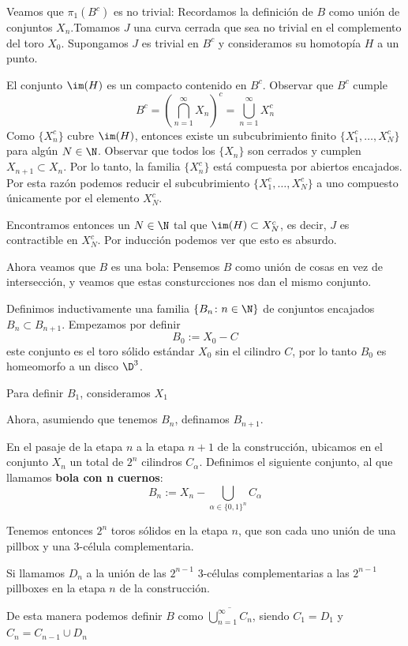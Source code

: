 
Veamos que $\pi_1(B^c)$ es no trivial: Recordamos la definición de $B$ como unión de conjuntos $X_n$.Tomamos $J$ una curva cerrada que sea no trivial en el complemento del toro $X_0$. Supongamos $J$ es trivial en $B^c$ y consideramos su homotopía $H$ a un punto. 
            
El conjunto $\im(H)$ es un compacto contenido en $B^c$. Observar que $B^c$ cumple $$B^c=\left(\bigcap\limits_{n=1}^\infty X_n\right)^c=\bigcup\limits_{n=1}^\infty X_n^c$$ 
Como $\{X_n^c\}$ cubre $\im(H)$, entonces existe un subcubrimiento finito $\{X_1^c,\dots, X_N^c\}$ para algún $N\in\N$. Observar que todos los $\{X_n\}$ son cerrados y cumplen $X_{n+1}\subset X_n$. Por lo tanto, la familia $\{X_n^c\}$ está compuesta por abiertos encajados. Por esta razón podemos reducir el subcubrimiento $\{X_1^c,\dots, X_N^c\}$ a uno compuesto únicamente por el elemento $X_N^c$. 

Encontramos entonces un $N\in\N$ tal que $\im(H)\subset X_N^c$, es decir, $J$ es contractible en $X_N^c$. Por inducción podemos ver que esto es absurdo. 

Ahora veamos que $B$ es una bola: Pensemos $B$ como unión de cosas en vez de intersección, y veamos que estas consturcciones nos dan el mismo conjunto. 

Definimos inductivamente una familia $\{B_n\colon n\in\N\}$ de conjuntos encajados $B_{n}\subset B_{n+1}$. Empezamos por definir $$B_0:= X_0 - C$$ este conjunto es el toro sólido estándar $X_0$ sin el cilindro $C$, por lo tanto $B_0$ es homeomorfo a un disco $\D^3$.

Para definir $B_1$, consideramos $X_1$

Ahora, asumiendo que tenemos $B_n$, definamos $B_{n+1}$.

En el pasaje de la etapa $n$ a la etapa $n+1$ de la construcción, ubicamos en el conjunto $X_n$ un total de $2^{n}$ cilindros $C_\alpha$. Definimos el siguiente conjunto, al que llamamos \textbf{bola con n cuernos}: $$B_n :=X_n - \bigcup\limits_{\alpha\in\{0,1\}^{n}}C_\alpha$$ 

Tenemos entonces $2^n$ toros sólidos en la etapa $n$, que son cada uno unión de una pillbox y una 3-célula complementaria. 

Si llamamos $D_n$ a la unión de las $2^{n-1}$ 3-células complementarias a las $2^{n-1}$ pillboxes en la etapa $n$ de la construcción. 

De esta manera podemos definir $B$ como $\overline{\bigcup\limits_{n=1}^\infty C_n}$, siendo $C_1=D_1$ y $C_n=C_{n-1}\cup D_n$ 
            
